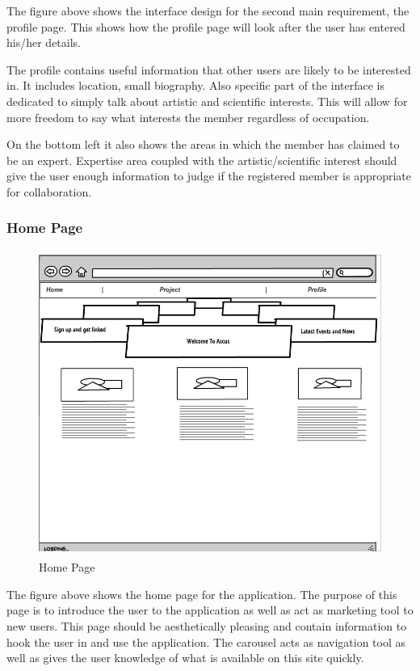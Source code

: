 \documentclass[a4paper,oneside,11pt]{report}
\begin{document}
The figure above shows the interface design for the second main requirement, the profile page. This shows how the profile page will look after the user has entered his/her details.


The profile contains useful information that other users are likely to be interested in. It includes location, small biography. Also specific part of the interface is dedicated to simply talk about artistic and scientific interests. This will allow for more freedom to say what interests the member regardless of occupation.

On the bottom left it also shows the areas in which the member has claimed to be an expert. Expertise area coupled with the artistic/scientific interest should give the user enough information to judge if the registered member is appropriate for collaboration.
\pagebreak

\subsubsection{Home Page}
\begin{figure}[!ht]
\centering
\includegraphics[width=\textwidth,height=10cm]{Homepage.jpg}
\caption{Home Page}
\end{figure}

The figure above shows the home page for the application. The purpose of this page is to introduce the user to the application as well as act as marketing tool to new users. This page should be aesthetically pleasing and contain information to hook the user in and use the application. The carousel acts as navigation tool as well as gives the user knowledge of what is available on this site quickly.
\pagebreak
\end{document}

